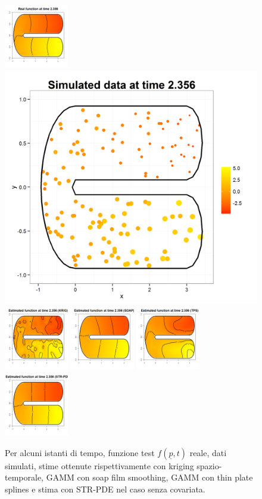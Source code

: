 \documentclass[a4paper,11pt,twoside,openright]{book}							%
\begin{document}
\begin{landscape}
\begin{figure}
\includegraphics[width=0.25\textwidth]{immagini/simulazioni/REALEtempo4.png}
\includegraphics[height=0.25\textwidth]{immagini/simulazioni/Dati_tempo4.png}
\includegraphics[width=0.25\textwidth]{immagini/simulazioni/KRIGtempo4.png}
\includegraphics[width=0.25\textwidth]{immagini/simulazioni/SOAPtempo4.png}
\includegraphics[width=0.25\textwidth]{immagini/simulazioni/TPStempo4.png}
\includegraphics[width=0.25\textwidth]{immagini/simulazioni/STSRtempo4.png}

\caption{Per alcuni istanti di tempo, funzione test $f(\underline p,t)$ reale, dati simulati, stime ottenute rispettivamente con kriging spazio-temporale, GAMM con soap film smoothing, GAMM con thin plate splines e stima con STR-PDE nel caso senza covariata.}
\label{fig:confronto_altri_metodi_nocov}
\end{figure}
\end{landscape}
\end{document}
